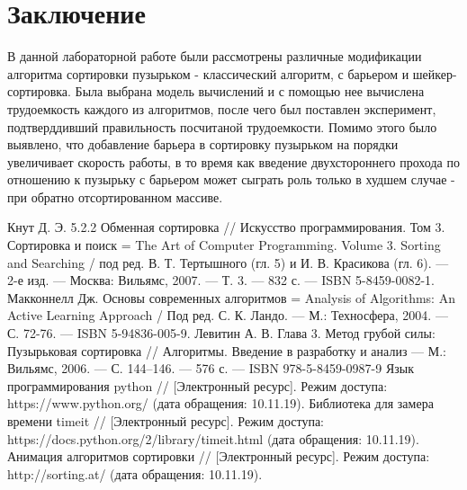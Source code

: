 \documentclass[a4paper, 14pt]{article}
\begin{document}
        \section*{Заключение}
        В данной лабораторной работе были рассмотрены различные модификации алгоритма сортировки пузырьком - классический алгоритм, с барьером и шейкер-сортировка. Была выбрана модель вычислений и с помощью нее вычислена трудоемкость каждого из алгоритмов, после чего был поставлен эксперимент, подтверддивший правильность посчитаной трудоемкости. Помимо этого было выявлено, что добавление барьера в сортировку пузырьком на порядки увеличивает скорость работы, в то время как введение двухстороннего прохода по отношению к пузырьку с барьером может сыграть роль только в худшем случае - при обратно отсортированном массиве.


    \begin{center}
    	\newpage
\newpage
{}

\begin{thebibliography}{11} 
    Кнут Д. Э. 5.2.2 Обменная сортировка // Искусство программирования. Том 3. Сортировка и поиск = The Art of Computer Programming. Volume 3. Sorting and Searching / под ред. В. Т. Тертышного (гл. 5) и И. В. Красикова (гл. 6). — 2-е изд. — Москва: Вильямс, 2007. — Т. 3. — 832 с. — ISBN 5-8459-0082-1.
      Макконнелл Дж. Основы современных алгоритмов = Analysis of Algorithms: An Active Learning Approach / Под ред. С. К. Ландо. — М.: Техносфера, 2004. — С. 72-76. — ISBN 5-94836-005-9.
      Левитин А. В. Глава 3. Метод грубой силы: Пузырьковая сортировка // Алгоритмы. Введение в разработку и анализ — М.: Вильямс, 2006. — С. 144–146. — 576 с. — ISBN 978-5-8459-0987-9
      Язык программирования python // [Электронный ресурс]. Режим
доступа: https://www.python.org/ (дата обращения: 10.11.19).
	 Библиотека для замера времени timeit // [Электронный ресурс]. Режим
доступа: https://docs.python.org/2/library/timeit.html (дата обращения: 10.11.19).
	 Анимация алгоритмов сортировки // [Электронный ресурс]. Режим
доступа: http://sorting.at/ (дата обращения: 10.11.19).
	
        
    \end{thebibliography}
	\newpage
	
	
    \end{center}        
\end{document}
